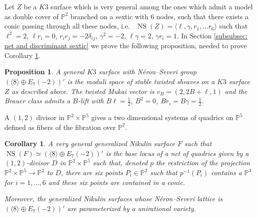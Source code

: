 \documentclass{amsart}
\newtheorem{corr}[thm]{Corollary}
\newtheorem{prop}[thm]{Proposition}
\theoremstyle{definition}
\numberwithin{equation}{section}
\numberwithin{equation}{section} \theoremstyle{definition}
\DeclareMathOperator{\NS}{NS}
\newcommand\PP{{\mathbb{P}}}
\begin{document}
Let $Z$ be a $K3$ surface which is very general among the ones which admit a model as double cover of $\mathbb{P}^2$ branched on a sextic with 6 nodes, such that there exists a conic passing through all these nodes, i.e.~ $\NS(Z)=\langle \ell, \gamma, r_1,\ldots r_6\rangle$ such that $\ell^2=2$, $\ell r_i=0$, $r_ir_j=-2\delta_{ij}$, $\gamma^2=-2$, $\ell\gamma=2$, $\gamma r_i=1$. In Section \ref{subsubsec: net and discriminant sextic} we prove the following proposition, needed to prove Corollary \ref{8'}.
\begin{prop}\label{propB}
 A general $K3$ surface with N\'eron--Severi group $\left(\langle 8\rangle\oplus E_7(-2)\right)'$ is the moduli space of stable twisted sheaves on a $K3$ surface $Z$ as described above.
 The twisted Mukai vector is $v_B=(2,2B+\ell,1)$ and the Brauer class admits a $B$-lift with $B\ell=\frac{1}{2}$, $B^2=0$,
 $Br_i=B\gamma=\frac{1}{2}$.
\end{prop}

A $(1,2)$ divisor in $\mathbb P^2 \times \mathbb P^5$ gives a two dimensional systems of  quadrics on $\PP^5$ defined as fibers of the fibration over $\PP^2$.
\begin{corr} \label{8'}
A very general generalized Nikulin surface $F$ such that $\NS(F)\simeq \left(\langle 8\rangle\oplus E_7(-2)\right)'$ is the base locus of a net of quadrics given by a $(1,2)$-divisor $D$ in $\mathbb P^2 \times \mathbb P^5$ such that, denoted $p$ the restriction of the projection $\mathbb P^2 \times \mathbb P^5\to \mathbb P^2$ to $D$, there are six points $P_i\in\mathbb{P}^2$ such that $p^{-1}(P_i)$ contains a $\mathbb{P}^3$ for $i=1,\ldots, 6$ and these six points are contained in a conic. 

Moreover, the generalized Nikulin surfaces whose N\'eron--Severi lattice is $\left(\langle 8\rangle\oplus E_7(-2)\right)'$ are parameterized by a unirational variety.
\end{corr}
\end{document}
